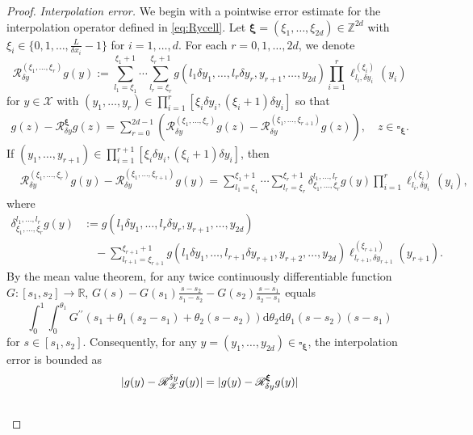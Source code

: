 \documentclass[11pt,reqno]{amsproc}
\newcommand{\ud}{\mathrm d}
\newcommand{\R}{\mathbb{R}}
\numberwithin{equation}{section}
\begin{document}
\begin{proof}
\textit{Interpolation error.}
We begin with a pointwise error estimate for the interpolation operator defined in \eqref{eq:Rycell}.
Let $\boldsymbol\xi=(\xi_1,\ldots,\xi_{2d})\in\mathbb{Z}^{2d}$ with $\xi_i\in\{0,1,\ldots,\frac{L}{\delta x_i}-1\}$ for $i=1,\ldots,d$. 
For each $r=0,1,\ldots,2d$, we denote 
\begin{equation*}
\mathscr{R}_{\delta y}^{(\xi_1,\ldots,\xi_r)}g(y):=\sum_{l_1=\xi_1}^{\xi_1+1}\cdots\sum_{l_r=\xi_r}^{\xi_r+1} g(l_1\delta y_1,\ldots,l_r\delta y_r,y_{r+1},\ldots,y_{2d}
)\prod_{i=1}^r\ell^{(\xi_i)}_{l_i,\delta y_i}(y_i) 
\end{equation*}
for $y\in \mathscr{X}$ with $(y_1,\ldots,y_r)\in\prod_{i=1}^{r}[\xi_i\delta y_i,(\xi_i+1)\delta y_i]$ so that 
\begin{align*}
g(z)-\mathscr{R}_{\delta y}^{\boldsymbol\xi}g(z)
=\sum_{r=0}^{2d-1}\left(\mathscr{R}_{\delta y}^{(\xi_1,\ldots,\xi_r)}g(z)-\mathscr{R}_{\delta y}^{(\xi_1,\ldots,\xi_{r+1})}g(z)\right),\quad z\in\square_{\boldsymbol\xi}.
\end{align*}
If $(y_1,\ldots,y_{r+1})\in \prod_{i=1}^{r+1}[\xi_i\delta y_i,(\xi_i+1)\delta y_i]$, then
\begin{align*}
&\mathscr{R}_{\delta y}^{(\xi_1,\ldots,\xi_r)}g(y)-\mathscr{R}_{\delta y}^{(\xi_1,\ldots,\xi_{r+1})}g(y)=\sum_{l_1=\xi_1}^{\xi_1+1}\cdots\sum_{l_r=\xi_r}^{\xi_r+1}
\delta _{\xi_1,\ldots,\xi_r}^{l_1,\ldots,l_{r}} g(y)
\prod_{i=1}^r\ell^{(\xi_i)}_{l_i,\delta y_i}(y_i),
\end{align*}
where 
\begin{align*}
\delta _{\xi_1,\ldots,\xi_{r}}^{l_1,\ldots,l_{r}}g(y)&:=g(l_1\delta y_1,\ldots,l_r\delta y_r,y_{r+1},\ldots,y_{2d})\\
&\quad-\sum_{l_{r+1}=\xi_{r+1}}^{\xi_{r+1}+1}g(l_1\delta y_1,\ldots,l_{r+1}\delta y_{r+1},y_{r+2},\ldots,y_{2d})\ell^{(\xi_{r+1})}_{l_{r+1},\delta y_{r+1}}(y_{r+1}).
\end{align*}
By the mean value theorem, for any twice continuously differentiable function $G:[s_1,s_2]\to \R$,  $G(s)-G(s_1)\frac{s-s_{2}}{s_1-s_2}-G(s_2)\frac{s-s_{1}}{s_2-s_1}$ equals
$$
\int_0^1\int_0^{\theta_1}G^{\prime\prime}(s_1+\theta_1(s_2-s_1)+\theta_2(s-s_2))\ud \theta_2\ud \theta_1(s-s_2)(s-s_1)$$
for $s\in[s_1,s_2]$. Consequently,
for any $y=(y_1,\ldots,y_{2d})\in\square_{\boldsymbol\xi}$, the interpolation error is bounded as
\begin{align}\label{eq:RgInte}
&|g(y)-\mathscr{R}_{\mathscr{X}}^{\delta y}g(y)|=|g(y)-\mathscr{R}_{\delta y}^{\boldsymbol\xi}g(y)|\\\notag

\end{align}
\end{proof}
\end{document}
